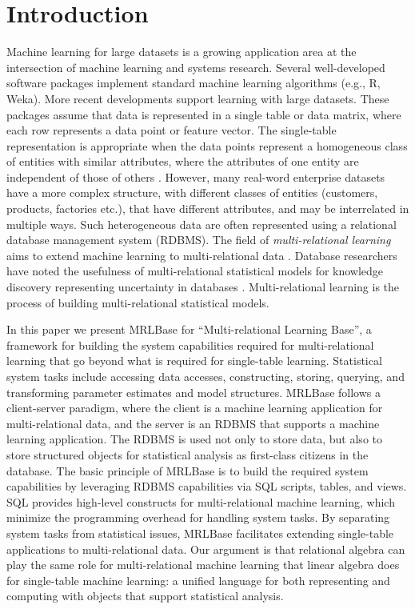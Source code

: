 \documentclass{acm_proc_article-sp}
\begin{document}
\section{Introduction} Machine learning for large datasets is a growing application area at the intersection of machine learning and systems research. Several well-developed software packages implement standard machine learning algorithms (e.g., R, Weka). More recent developments support learning with large datasets. 
These packages assume that data is represented in a single table or data matrix, where each row represents a data point or feature vector. The single-table representation is appropriate when the data points represent a homogeneous class of entities with similar attributes, where the attributes of one entity are independent of those of others \cite{Bishop2006}. However, many real-word enterprise datasets have a more complex structure, with different classes of entities (customers, products, factories etc.), that have different attributes, and may be interrelated in multiple ways. Such heterogeneous data are often represented using a relational database management system (RDBMS). The field of {\em multi-relational learning} aims to extend machine learning to multi-relational data \cite{SRL2007,Domingos2009,Dzeroski2001c}. Database researchers have noted the usefulness of multi-relational statistical models for knowledge discovery representing uncertainty in databases \cite{Deshpande2007,Graepel_CIKM13,Wang2008}. Multi-relational learning is the process of building multi-relational statistical models.

In this paper we present MRLBase for ``Multi-relational Learning Base'', a framework for building the system capabilities required for multi-relational learning that go beyond what is required for single-table learning. Statistical system tasks include accessing data accesses, constructing, storing, querying, and transforming parameter estimates and model structures. MRLBase follows a client-server paradigm, where the client is a machine learning application for multi-relational data, and the server is an RDBMS that supports a machine learning application. The RDBMS is used not only to store data, but also to store structured objects for statistical analysis as first-class citizens in the database. The basic principle of MRLBase is to build the required system capabilities by leveraging RDBMS capabilities via SQL scripts, tables, and views.  SQL provides high-level constructs for multi-relational machine learning, which minimize the programming overhead for handling system tasks. By separating system tasks from statistical issues, MRLBase facilitates extending single-table applications to multi-relational data.
Our argument is that relational algebra can play the same role for multi-relational machine learning that linear algebra does for single-table machine learning:  a unified language for both representing and computing with objects that support statistical analysis. 
\end{document}
